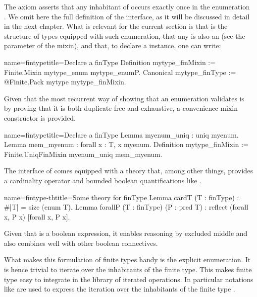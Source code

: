 The axiom asserts that any inhabitant of  occurs exactly once
in the enumeration .  We omit here the full definition of the
interface, as it will be discussed in detail in the next chapter.
What is relevant for the current section is that  is the
structure of types equipped with such enumeration, that any 
is also an  (see the parameter of the mixin), and that,
to declare a  instance, one can write:

\begin{coq}{name=fintype}{title=Declare a finType}
Definition mytype_finMixin := Finite.Mixin mytype_enum mytype_enumP.
Canonical mytype_finType := @Finite.Pack mytype mytype_finMixin.
\end{coq}

Given that the most recurrent way of showing that an enumeration
validates  is by proving that it is both duplicate-free
and exhaustive, a convenience mixin constructor is provided.

\begin{coq}{name=fintype}{title=Declare a finType}
Lemma myenum_uniq : uniq myenum.
Lemma mem_myenum : forall x : T, x \in myenum.
Definition mytype_finMixin := Finite.UniqFinMixin myenum_uniq mem_myenum.
\end{coq}

The interface of  comes equipped with a theory that, among
other things, provides a cardinality operator  and bounded
boolean quantifications like \C{[forall x, P]}.

\begin{coq}{name=fintype-th}{title=Some theory for finType}
Lemma cardT (T : finType) : #|T| = size (enum T).
Lemma forallP (T : finType) (P : pred T) : reflect (forall x, P x) [forall x, P x].
\end{coq}

Given that \C{[forall x, P x]} is a boolean expression,
it enables reasoning by excluded middle and also combines well with
other boolean connectives.

What makes this formulation of finite types handy is the explicit
enumeration.  It is hence trivial to iterate over the inhabitants of the
finite type.  This makes finite type easy to integrate in the
library of iterated operations.  In particular notations like
 are used to express the iteration over the
inhabitants of the finite type .

